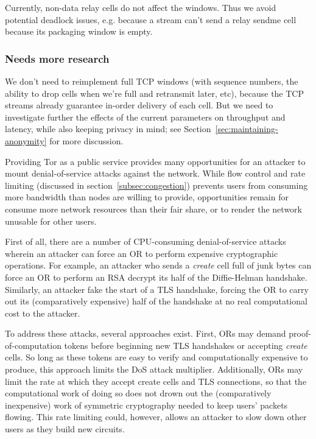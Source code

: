 \documentclass[times,10pt,twocolumn]{article}
\begin{document}
Currently, non-data relay cells do not affect the windows. Thus we
avoid potential deadlock issues, e.g. because a stream can't send a
relay sendme cell because its packaging window is empty.

\subsubsection{Needs more research}

We don't need to reimplement full TCP windows (with sequence numbers,
the ability to drop cells when we're full and retransmit later, etc),
because the TCP streams already guarantee in-order delivery of each
cell. But we need to investigate further the effects of the current
parameters on throughput and latency, while also keeping privacy in mind;
see Section~\ref{sec:maintaining-anonymity} for more discussion.


\label{subsec:dos}

Providing Tor as a public service provides many opportunities for an
attacker to mount denial-of-service attacks against the network.  While
flow control and rate limiting (discussed in
section~\ref{subsec:congestion}) prevents users from consuming more
bandwidth than nodes are willing to provide, opportunities remain for
consume more network resources than their fair share, or to render the
network unusable for other users.

First of all, there are a number of CPU-consuming denial-of-service
attacks wherein an attacker can force an OR to perform expensive
cryptographic operations.  For example, an attacker who sends a
\emph{create} cell full of junk bytes can force an OR to perform an RSA
decrypt its half of the Diffie-Helman handshake.  Similarly, an attacker
fake the start of a TLS handshake, forcing the OR to carry out its
(comparatively expensive) half of the handshake at no real computational
cost to the attacker.

To address these attacks, several approaches exist.  First, ORs may
demand proof-of-computation tokens \cite{hashcash} before beginning new
TLS handshakes or accepting \emph{create} cells.  So long as these
tokens are easy to verify and computationally expensive to produce, this
approach limits the DoS attack multiplier.  Additionally, ORs may limit
the rate at which they accept create cells and TLS connections, so that
the computational work of doing so does not drown out the (comparatively
inexpensive) work of symmetric cryptography needed to keep users'
packets flowing.  This rate limiting could, however, allows an attacker
to slow down other users as they build new circuits.
\end{document}
